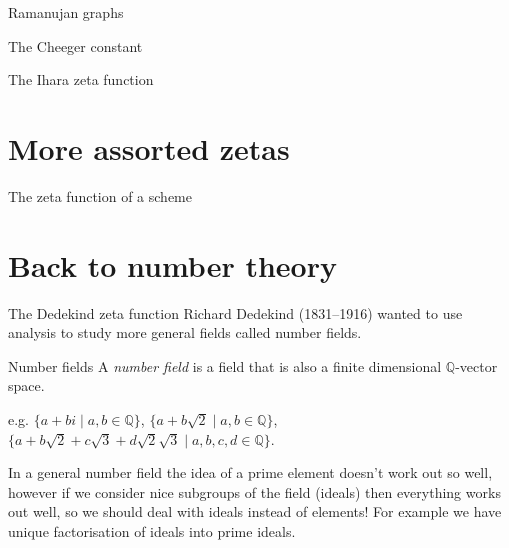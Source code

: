 \documentclass{beamer}
\begin{document}
\begin{frame}{Ramanujan graphs}
\begin{block}{The Cheeger constant}

\end{block}
\end{frame}

\begin{frame}{The Ihara zeta function}
\begin{block}{}
\end{block}
\end{frame}

\section[More zetas]{More assorted zetas}

\begin{frame}{The zeta function of a scheme}
\begin{block}{}
\end{block}
\end{frame}

\section[Number theory again]{Back to number theory}
\begin{frame}{The Dedekind zeta function}
Richard Dedekind (1831--1916) wanted to use analysis to study more general fields called number fields.

\pause \begin{block}{Number fields}
A \emph{number field} is a field that is also a finite dimensional $\mathbb{Q}$-vector space.
\end{block}

\pause e.g. $\{a+bi\mid a,b\in\mathbb{Q}\}$, \pause $\{a+b\sqrt{2}\mid a,b\in\mathbb{Q}\}$, \pause $\{a+b\sqrt{2} +c\sqrt{3}+d\sqrt{2}\sqrt{3}\mid a,b,c,d\in\mathbb{Q}\}$.

\pause In a general number field the idea of a prime element doesn't work out so well, however if we consider nice subgroups of the field (ideals) then everything works out well, so we should deal with ideals instead of elements!
\pause For example we  have unique factorisation of ideals into prime ideals.
\end{frame}
\end{document}
